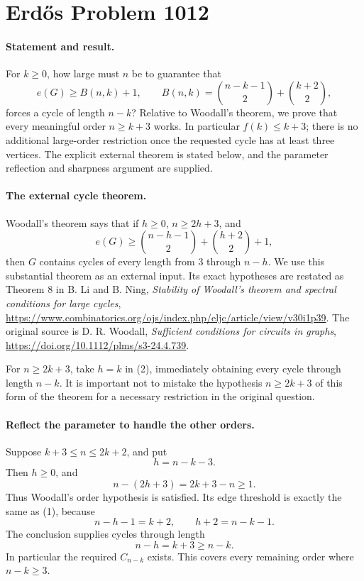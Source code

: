 \section*{Erd\H{o}s Problem 1012}

\paragraph{Statement and result.}
For \(k\geq0\), how large must \(n\) be to guarantee that
\[
 e(G)\geq B(n,k)+1,\qquad
 B(n,k)=\binom{n-k-1}{2}+\binom{k+2}{2},
\tag{1}
\]
forces a cycle of length \(n-k\)? Relative to Woodall's theorem, we prove that every meaningful order \(n\geq k+3\) works. In particular \(f(k)\leq k+3\); there is no additional large-order restriction once the requested cycle has at least three vertices. The explicit external theorem is stated below, and the parameter reflection and sharpness argument are supplied.

\paragraph{The external cycle theorem.}
Woodall's theorem says that if \(h\geq0\), \(n\geq2h+3\), and
\[
 e(G)\geq\binom{n-h-1}{2}+\binom{h+2}{2}+1,
\tag{2}
\]
then \(G\) contains cycles of every length from \(3\) through \(n-h\). We use this substantial theorem as an external input. Its exact hypotheses are restated as Theorem 8 in B. Li and B. Ning, \emph{Stability of Woodall's theorem and spectral conditions for large cycles}, \url{https://www.combinatorics.org/ojs/index.php/eljc/article/view/v30i1p39}. The original source is D. R. Woodall, \emph{Sufficient conditions for circuits in graphs}, \url{https://doi.org/10.1112/plms/s3-24.4.739}.

For \(n\geq2k+3\), take \(h=k\) in (2), immediately obtaining every cycle through length \(n-k\). It is important not to mistake the hypothesis \(n\geq2k+3\) of this form of the theorem for a necessary restriction in the original question.

\paragraph{Reflect the parameter to handle the other orders.}
Suppose \(k+3\leq n\leq2k+2\), and put
\[
 h=n-k-3.
\]
Then \(h\geq0\), and
\[
 n-(2h+3)=2k+3-n\geq1.
\]
Thus Woodall's order hypothesis is satisfied. Its edge threshold is exactly the same as (1), because
\[
 n-h-1=k+2,\qquad h+2=n-k-1.
\]
The conclusion supplies cycles through length
\[
 n-h=k+3\geq n-k.
\]
In particular the required \(C_{n-k}\) exists. This covers every remaining order where \(n-k\geq3\).

